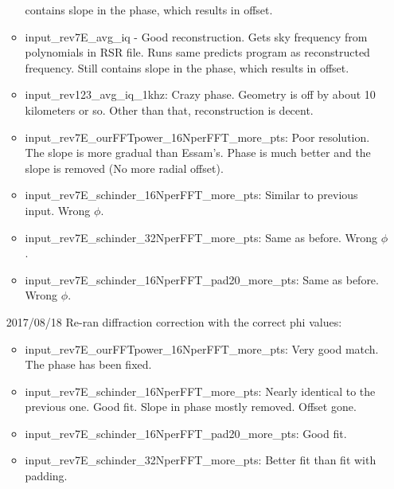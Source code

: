 \documentclass[crop=false,class=article,oneside]{standalone}
\begin{document}
\begin{enumerate}[leftmargin=55pt]
\begin{itemize}
                      contains slope in the phase, which results in offset.
                \item input\_rev7E\_avg\_iq - Good reconstruction.
                      Gets sky frequency from polynomials in RSR file.
                      Runs same predicts program as reconstructed frequency.
                      Still contains slope in the phase,
                      which results in offset.
                \item input\_rev123\_avg\_iq\_1khz: Crazy phase.
                      Geometry is off by about 10 kilometers or so.
                      Other than that, reconstruction is decent.
                \item input\_rev7E\_ourFFTpower\_16NperFFT\_more\_pts:
                      Poor resolution. The slope is more gradual than
                      Essam's. Phase is much better and the slope is
                      removed (No more radial offset). 
                \item input\_rev7E\_schinder\_16NperFFT\_more\_pts:
                      Similar to previous input. Wrong $\phi$.
                \item input\_rev7E\_schinder\_32NperFFT\_more\_pts:
                      Same as before. Wrong $\phi$.
                \item input\_rev7E\_schinder\_16NperFFT\_pad20\_more\_pts:
                      Same as before. Wrong $\phi$.
            \end{itemize}
            \item[2017/08/18] Re-ran diffraction correction 
                              with the correct phi values:
            \begin{itemize}
                \item input\_rev7E\_ourFFTpower\_16NperFFT\_more\_pts:
                      Very good match. The phase has been fixed.
                \item input\_rev7E\_schinder\_16NperFFT\_more\_pts:
                      Nearly identical to the previous one. Good fit.
                      Slope in phase mostly removed. Offset gone.
                \item input\_rev7E\_schinder\_16NperFFT\_pad20\_more\_pts:
                      Good fit.
                \item input\_rev7E\_schinder\_32NperFFT\_more\_pts:
                      Better fit than fit with padding.
            \end{itemize}
        \end{enumerate}
\end{document}
